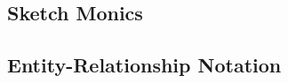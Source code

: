 \iffalse
\subsection{Categories}


\subsection{Categories with Designated Monomorphisms and Epimorphims}


\subsection{Categories with Finite Products and Designated Monomorphisms and Epimorphims}

\fi

\subsection{Sketch Monics}


\subsection{Entity-Relationship Notation}


\iffalse
\begin{frame}{Bibliography}

\end{frame}
\fi

